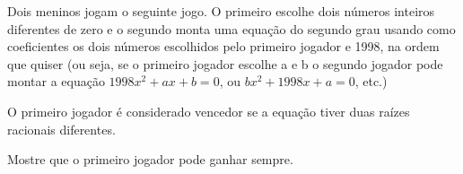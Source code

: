 Dois meninos jogam o seguinte jogo.
O primeiro escolhe dois números inteiros diferentes de zero e o segundo monta uma equação do segundo grau usando como coeficientes os dois números escolhidos pelo primeiro jogador e 1998, na ordem que quiser (ou seja, se o primeiro jogador escolhe a e b o segundo jogador pode montar a equação $1998x^2 + ax + b = 0$, ou $bx^2 + 1998x + a = 0$, etc.)

O primeiro jogador é considerado vencedor se a equação tiver duas raízes racionais diferentes.

Mostre que o primeiro jogador pode ganhar sempre.